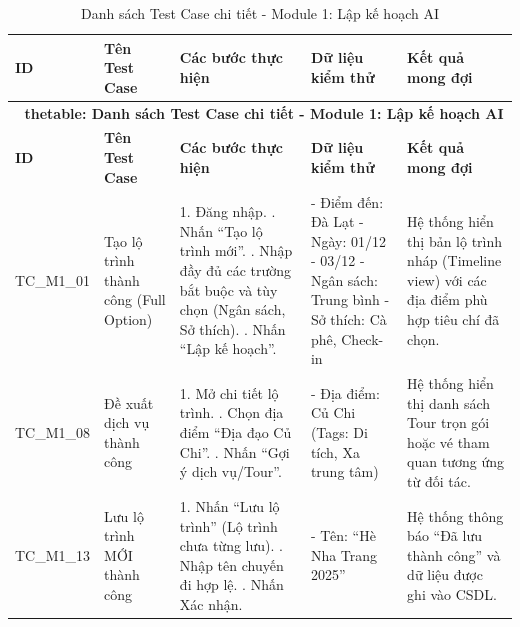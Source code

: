 \begin{landscape}
\small 
\begin{longtable}{|p{2.5cm}|p{4.0cm}|p{6.5cm}|p{4.5cm}|p{4.5cm}|}

\caption{Danh sách Test Case chi tiết - Module 1: Lập kế hoạch AI} \label{tab:tc_module1} \\
\hline
\textbf{ID} & \textbf{Tên Test Case} & \textbf{Các bước thực hiện} & \textbf{Dữ liệu kiểm thử} & \textbf{Kết quả mong đợi} \\
\hline
\endfirsthead

\multicolumn{5}{c}{{\bfseries \tablename\ thetable{}: Danh sách Test Case chi tiết - Module 1: Lập kế hoạch AI}} \\
\hline
\textbf{ID} & \textbf{Tên Test Case} & \textbf{Các bước thực hiện} & \textbf{Dữ liệu kiểm thử} & \textbf{Kết quả mong đợi} \\
\hline
\endhead

\hline
\endlastfoot


TC\_M1\_01 & Tạo lộ trình thành công (Full Option) & 
1. Đăng nhập. \newline 
2. Nhấn ``Tạo lộ trình mới''. \newline 
3. Nhập đầy đủ các trường bắt buộc và tùy chọn (Ngân sách, Sở thích). \newline 
4. Nhấn ``Lập kế hoạch''. & 
- Điểm đến: Đà Lạt \newline 
- Ngày: 01/12 - 03/12 \newline 
- Ngân sách: Trung bình \newline 
- Sở thích: Cà phê, Check-in & 
Hệ thống hiển thị bản lộ trình nháp (Timeline view) với các địa điểm phù hợp tiêu chí đã chọn. \\
\hline

TC\_M1\_08 & Đề xuất dịch vụ thành công & 
1. Mở chi tiết lộ trình. \newline 
2. Chọn địa điểm ``Địa đạo Củ Chi''. \newline 
3. Nhấn ``Gợi ý dịch vụ/Tour''. & 
- Địa điểm: Củ Chi (Tags: Di tích, Xa trung tâm) & 
Hệ thống hiển thị danh sách Tour trọn gói hoặc vé tham quan tương ứng từ đối tác. \\
\hline

TC\_M1\_13 & Lưu lộ trình MỚI thành công & 
1. Nhấn ``Lưu lộ trình'' (Lộ trình chưa từng lưu). \newline 
2. Nhập tên chuyến đi hợp lệ. \newline 
3. Nhấn Xác nhận. & 
- Tên: ``Hè Nha Trang 2025'' & 
Hệ thống thông báo ``Đã lưu thành công'' và dữ liệu được ghi vào CSDL. \\
\hline


\end{longtable}
\end{landscape}
